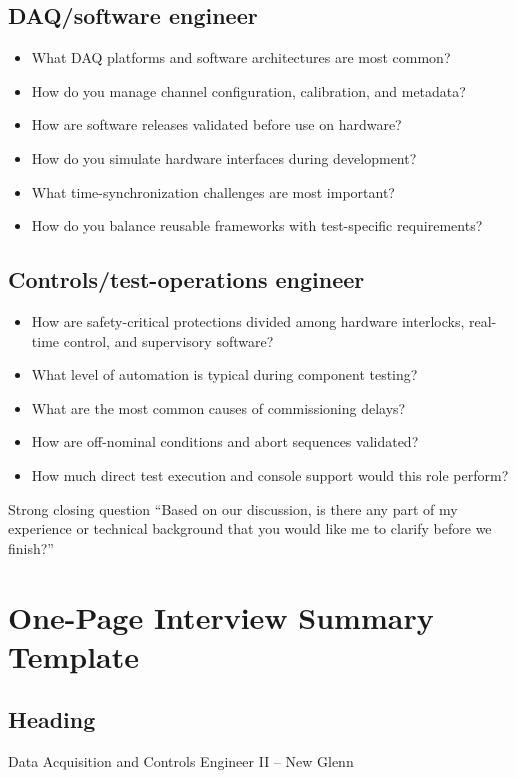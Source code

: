 \documentclass[11pt]{article}
\begin{document}
\subsection{DAQ/software engineer}
\begin{itemize}
  \item What DAQ platforms and software architectures are most common?
  \item How do you manage channel configuration, calibration, and metadata?
  \item How are software releases validated before use on hardware?
  \item How do you simulate hardware interfaces during development?
  \item What time-synchronization challenges are most important?
  \item How do you balance reusable frameworks with test-specific requirements?
\end{itemize}

\subsection{Controls/test-operations engineer}
\begin{itemize}
  \item How are safety-critical protections divided among hardware interlocks, real-time control, and supervisory software?
  \item What level of automation is typical during component testing?
  \item What are the most common causes of commissioning delays?
  \item How are off-nominal conditions and abort sequences validated?
  \item How much direct test execution and console support would this role perform?
\end{itemize}

\begin{answerbox}{Strong closing question}
``Based on our discussion, is there any part of my experience or technical
background that you would like me to clarify before we finish?''
\end{answerbox}

\section{One-Page Interview Summary Template}

\subsection*{Heading}
Data Acquisition and Controls Engineer II -- New Glenn
\end{document}
